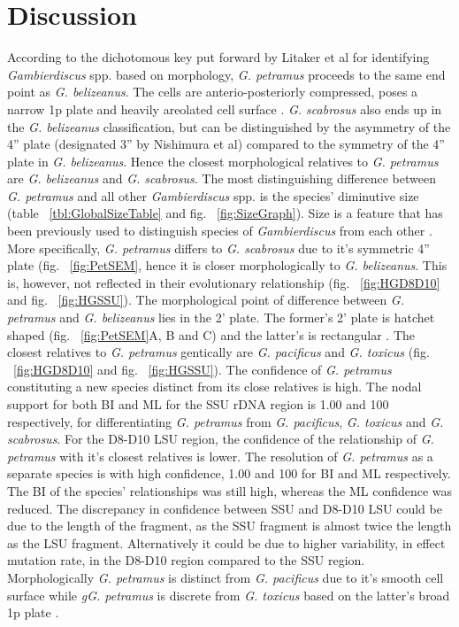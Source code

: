 \documentclass[12pt]{article}
\begin{document}
\section{Discussion}
According to the dichotomous key put forward by Litaker et al for identifying \emph{Gambierdiscus} spp. based on morphology, \emph{G. petramus} proceeds to the same end point as \emph{G. belizeanus}. The cells are anterio-posteriorly compressed, poses a narrow 1p plate and heavily areolated cell surface \cite{litaker2009taxonomy}. \emph{G. scabrosus} also ends up in the \emph{G. belizeanus} classification, but can be distinguished by the asymmetry of the 4'' plate (designated 3'' by Nishimura et al) compared to the symmetry of the 4'' plate in \emph{G. belizeanus}\cite{nishimura2014morphology}. Hence the closest morphological relatives to \emph{G. petramus} are \emph{G. belizeanus} and \emph{G. scabrosus}. The most distinguishing difference between \emph{G. petramus} and all other \emph{Gambierdiscus} spp. is the species' diminutive size (table ~\ref{tbl:GlobalSizeTable} and fig. ~\ref{fig:SizeGraph}). Size is a feature that has been previously used to distinguish species of \emph{Gambierdiscus} from each other \cite{litaker2009taxonomy}. 
More specifically, \emph{G. petramus} differs to \emph{G. scabrosus} due to it's symmetric 4'' plate (fig. ~\ref{fig:PetSEM}, hence it is closer morphologically to \emph{G. belizeanus}. This is, however, not reflected in their evolutionary relationship (fig. ~\ref{fig:HGD8D10} and fig. ~\ref{fig:HGSSU}). The morphological point of difference between \emph{G. petramus} and \emph{G. belizeanus} lies in the 2' plate. The former's 2' plate is hatchet shaped (fig. ~\ref{fig:PetSEM}A, B and C) and the latter's is rectangular \cite{faust1995observation}. 
The closest relatives to \emph{G. petramus} gentically are \emph{G. pacificus} and \emph{G. toxicus} (fig. ~\ref{fig:HGD8D10} and fig. ~\ref{fig:HGSSU}). The confidence of \emph{G. petramus} constituting a new species distinct from its close relatives is high. The nodal support for both BI and ML for the SSU rDNA region is 1.00 and 100 respectively, for differentiating \emph{G. petramus} from \emph{G. pacificus}, \emph{G. toxicus} and \emph{G. scabrosus}. For the D8-D10 LSU region, the confidence of the relationship of \emph{G. petramus} with it's closest relatives is lower. The resolution of \emph{G. petramus} as a separate species is with high confidence, 1.00 and 100 for BI and ML respectively. The BI of the species' relationships was still high, whereas the ML confidence was reduced. %
The discrepancy in confidence between SSU and D8-D10 LSU could be due to the length of the fragment, as the SSU fragment is almost twice the length as the LSU fragment. Alternatively it could be due to higher variability, in effect mutation rate, in the D8-D10 region compared to the SSU region.
Morphologically \emph{G. petramus} is distinct from \emph{G. pacificus} due to it's smooth cell surface \cite{chinain1999morphology} while \emph{gG. petramus} is discrete from \emph{G. toxicus} based on the latter's broad 1p plate \cite{litaker2009taxonomy}.
\end{document}
